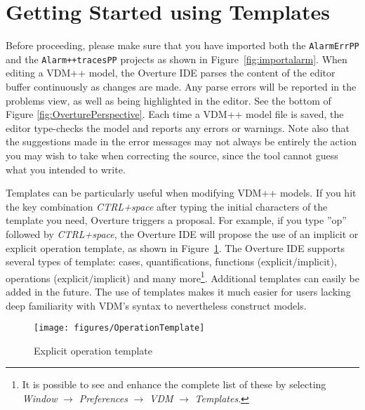 \section{Getting Started using Templates}\label{sec:templates}
Before proceeding, please make sure that you have imported both the \texttt{AlarmErrPP} and the \texttt{Alarm++tracesPP} projects as shown in Figure~\ref{fig:importalarm}. When editing a VDM++ model, the Overture IDE parses the content of the editor buffer continuously as changes are made. Any parse errors will be reported in the problems view, as well as being highlighted in the editor. See the bottom of Figure \ref{fig:OverturePerspective}. Each time a VDM++ model file is saved, the editor type-checks the model and reports any errors or warnings. Note also that the suggestions made in the error messages may not always be entirely the action you may wish to take when correcting the source, since the tool cannot guess what you intended to write.

Templates can be particularly useful when modifying VDM++ models. If you hit the key combination \textit{CTRL+space} after typing the initial characters of the template you need, Overture triggers a proposal. For example, if you type ''op'' followed by \textit{CTRL+space}, the Overture IDE will propose the use of an implicit or explicit operation template, as shown in Figure~\ref{fig:operationTemplate}. The Overture IDE supports several types of template: cases, quantifications, functions (explicit/implicit), operations (explicit/implicit) and many more\footnote{It is possible to see and enhance the complete list of these by selecting \emph{Window} $\rightarrow$ \emph{Preferences} $\rightarrow$ \emph{VDM}  $\rightarrow$ \emph{Templates}.}.  Additional templates can easily be added in the future. The use of templates makes it much easier for users lacking deep familiarity with VDM's syntax to nevertheless construct models.
%
\begin{figure}
	\begin{center}
	\texttt{[image: figures/OperationTemplate]}
	\caption{Explicit operation template}
	\label{fig:operationTemplate}
	\end{center}
\end{figure}

